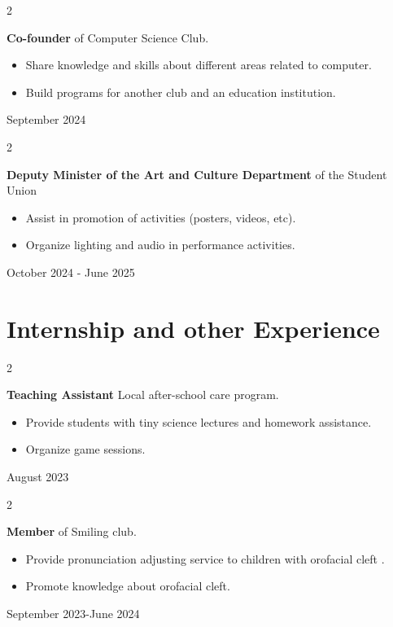 \documentclass[10pt, letterpaper]{article}
\newenvironment{highlights}{
    \begin{itemize}[
        topsep=0.10 cm,
        parsep=0.10 cm,
        partopsep=0pt,
        itemsep=0pt,
        leftmargin=0.4 cm + 10pt
    ]
}{
    \end{itemize}
} %
\newenvironment{twocolentry}[2][]{
    \onecolentry
    \def\secondColumn{#2}
    \setcolumnwidth{\fill, 4.5 cm}
    \begin{paracol}{2}
}{
    \switchcolumn \raggedleft \secondColumn
    \end{paracol}
    \endonecolentry
} %
\begin{document}
    \begin{twocolentry}{ September 2024 }
        \textbf{Co-founder} of Computer Science Club.

        \begin{highlights}
            \item Share knowledge and skills about different areas related to computer.
            \item Build programs for another club and an education institution.
        \end{highlights}
    \end{twocolentry}

    \begin{twocolentry}{ October 2024 - June 2025 }
        \textbf{Deputy Minister of the Art and Culture Department} of the Student Union

        \begin{highlights}
            \item Assist in promotion of activities (posters, videos, etc).
            \item Organize lighting and audio in performance activities.
        \end{highlights}
    \end{twocolentry}

    \section{Internship and other Experience}    
        \begin{twocolentry}{ August 2023 }
            \textbf{Teaching Assistant} Local after-school care program.

            \begin{highlights}
                \item Provide students with tiny science lectures and homework assistance.
                \item Organize game sessions.
            \end{highlights}
        \end{twocolentry}

        \begin{twocolentry}{ September 2023-June 2024}
            \textbf{Member} of Smiling club.

            \begin{highlights}
                \item Provide pronunciation adjusting service to children with orofacial cleft .
                \item Promote knowledge about orofacial cleft.
            \end{highlights}
        \end{twocolentry}
\end{document}
